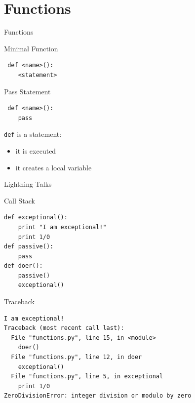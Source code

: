 \documentclass{beamer}
\begin{document}
\section{Functions}


\begin{frame}[fragile]{Functions}

{\Large Minimal Function}

\begin{verbatim}
￼def <name>():
    <statement>
\end{verbatim}

\pause
{\Large Pass Statement}

\begin{verbatim}
￼def <name>():
    pass
\end{verbatim}

\pause
{\large \verb+def+ is a statement:}
\begin{itemize}
  \item it is executed
  \item it creates a local variable
\end{itemize}

\end{frame}

\begin{frame}{Lightning Talks}

\vspace{0.2in}{\large￼function defs must be executed before the functions can be called}

\pause
\vspace{0.2in}{\large￼functions call functions this makes a stack that's all a trace back is}

\end{frame}

\begin{frame}[fragile]{Call Stack}

\begin{verbatim}
def exceptional():
    print "I am exceptional!"
    print 1/0
def passive():
    pass
def doer():
    passive()
    exceptional()
\end{verbatim}

\end{frame}

\begin{frame}[fragile]{Traceback}

\begin{verbatim}
I am exceptional!
Traceback (most recent call last):
  File "functions.py", line 15, in <module>
    doer()
  File "functions.py", line 12, in doer
    exceptional()
  File "functions.py", line 5, in exceptional
    print 1/0
ZeroDivisionError: integer division or modulo by zero
\end{verbatim}

\end{frame}
\end{document}
